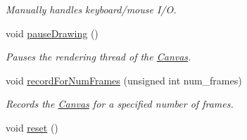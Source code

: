 \begin{DoxyCompactItemize}
\begin{DoxyCompactList}\small\item\em Manually handles keyboard/mouse I/\+O. \end{DoxyCompactList}\item 
void \hyperlink{classtsgl_1_1_canvas_abe021ab5148cc1327523689bced0f35a}{pause\+Drawing} ()
\begin{DoxyCompactList}\small\item\em Pauses the rendering thread of the \hyperlink{classtsgl_1_1_canvas}{Canvas}. \end{DoxyCompactList}\item 
void \hyperlink{classtsgl_1_1_canvas_a47436daa39473ddb4044bac7b3b27151}{record\+For\+Num\+Frames} (unsigned int num\+\_\+frames)
\begin{DoxyCompactList}\small\item\em Records the \hyperlink{classtsgl_1_1_canvas}{Canvas} for a specified number of frames. \end{DoxyCompactList}\item 
\hypertarget{classtsgl_1_1_canvas_ada6403439b583910d27e497148da5f2e}{}void \hyperlink{classtsgl_1_1_canvas_ada6403439b583910d27e497148da5f2e}{reset} ()\label{classtsgl_1_1_canvas_ada6403439b583910d27e497148da5f2e}


\end{DoxyCompactItemize}
